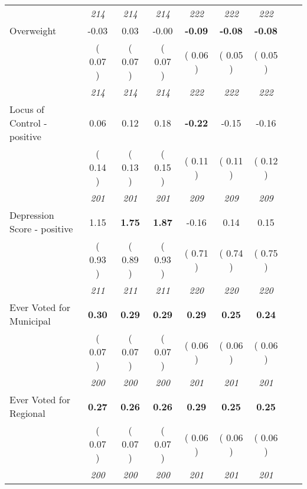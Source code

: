 \begin{tabular}{l c c c c c c c c}
& \textit{ 214 } & \textit{ 214 } & \textit{ 214 } & \textit{ 222 } & \textit{ 222 } & \textit{ 222 } \\
Overweight &     -0.03 &      0.03 &     -0.00 & \textbf{     -0.09 } & \textbf{     -0.08 } & \textbf{     -0.08 } \\
& (     0.07 ) & (     0.07 ) & (     0.07 ) & (     0.06 ) & (     0.05 ) & (     0.05 ) \\
& \textit{ 214 } & \textit{ 214 } & \textit{ 214 } & \textit{ 222 } & \textit{ 222 } & \textit{ 222 } \\
Locus of Control - positive &      0.06 &      0.12 &      0.18 & \textbf{     -0.22 } &     -0.15 &     -0.16 \\
& (     0.14 ) & (     0.13 ) & (     0.15 ) & (     0.11 ) & (     0.11 ) & (     0.12 ) \\
& \textit{ 201 } & \textit{ 201 } & \textit{ 201 } & \textit{ 209 } & \textit{ 209 } & \textit{ 209 } \\
Depression Score - positive &      1.15 & \textbf{      1.75 } & \textbf{      1.87 } &     -0.16 &      0.14 &      0.15 \\
& (     0.93 ) & (     0.89 ) & (     0.93 ) & (     0.71 ) & (     0.74 ) & (     0.75 ) \\
& \textit{ 211 } & \textit{ 211 } & \textit{ 211 } & \textit{ 220 } & \textit{ 220 } & \textit{ 220 } \\
Ever Voted for Municipal & \textbf{      0.30 } & \textbf{      0.29 } & \textbf{      0.29 } & \textbf{      0.29 } & \textbf{      0.25 } & \textbf{      0.24 } \\
& (     0.07 ) & (     0.07 ) & (     0.07 ) & (     0.06 ) & (     0.06 ) & (     0.06 ) \\
& \textit{ 200 } & \textit{ 200 } & \textit{ 200 } & \textit{ 201 } & \textit{ 201 } & \textit{ 201 } \\
Ever Voted for Regional & \textbf{      0.27 } & \textbf{      0.26 } & \textbf{      0.26 } & \textbf{      0.29 } & \textbf{      0.25 } & \textbf{      0.25 } \\
& (     0.07 ) & (     0.07 ) & (     0.07 ) & (     0.06 ) & (     0.06 ) & (     0.06 ) \\
& \textit{ 200 } & \textit{ 200 } & \textit{ 200 } & \textit{ 201 } & \textit{ 201 } & \textit{ 201 } \\
\bottomrule
\end{tabular}

